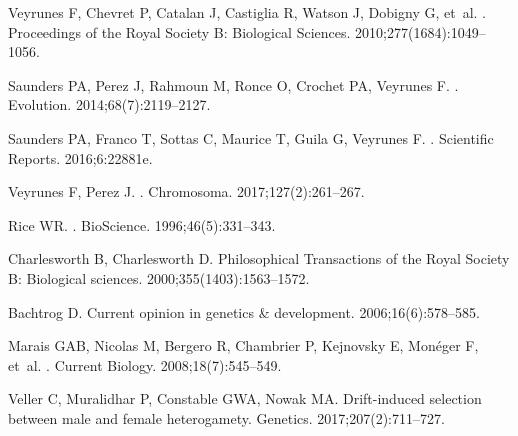 \documentclass[10pt,letterpaper]{article}
\begin{document}
\begin{thebibliography}{100}
Veyrunes F, Chevret P, Catalan J, Castiglia R, Watson J, Dobigny G, et~al.
.
\newblock Proceedings of the Royal Society B: Biological Sciences.
  2010;277(1684):1049--1056.

Saunders PA, Perez J, Rahmoun M, Ronce O, Crochet PA, Veyrunes F.
.
\newblock Evolution. 2014;68(7):2119--2127.

Saunders PA, Franco T, Sottas C, Maurice T, Guila G, Veyrunes F.
.
\newblock Scientific Reports. 2016;6:22881e.

Veyrunes F, Perez J.
.
\newblock Chromosoma. 2017;127(2):261--267.

Rice WR.
.
\newblock BioScience. 1996;46(5):331--343.

Charlesworth B, Charlesworth D.
\newblock Philosophical Transactions of the Royal Society B: Biological
  sciences. 2000;355(1403):1563--1572.

Bachtrog D.
\newblock Current opinion in genetics {\&} development. 2006;16(6):578--585.

Marais GAB, Nicolas M, Bergero R, Chambrier P, Kejnovsky E, Mon{\'e}ger F,
  et~al.
.
\newblock Current Biology. 2008;18(7):545--549.

Veller C, Muralidhar P, Constable GWA, Nowak MA.
\newblock Drift-induced selection between male and female heterogamety.
\newblock Genetics. 2017;207(2):711--727.

\end{thebibliography}
\end{document}
